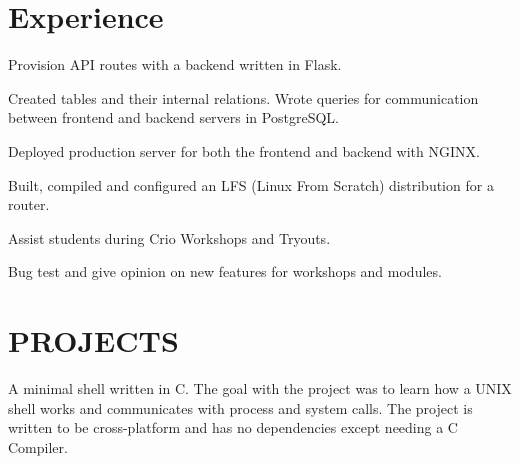 \documentclass[]{resume-openfont}
\begin{document}
\begin{minipage}[t]{0.66\textwidth}


\section{Experience}

\vspace{\topsep} %
\begin{tightemize}
\item Provision API routes with a backend written in Flask.
\item Created tables and their internal relations. Wrote queries for communication between frontend and backend servers in PostgreSQL.
\item Deployed production server for both the frontend and backend with NGINX.
\end{tightemize}
\sectionsep


\begin{tightemize}
\item Built, compiled and configured an LFS (Linux From Scratch) distribution for a router.
\end{tightemize}
\sectionsep

\begin{tightemize}
\item Assist students during Crio Workshops and Tryouts.
\item Bug test and give opinion on new features for workshops and modules.
\end{tightemize}
\sectionsep


\section{PROJECTS}

A minimal shell written in C. The goal with the project was to learn how a UNIX shell works and communicates with process and system calls. The project is written to be cross-platform and has no dependencies except needing a C Compiler.\\
\sectionsep


\end{minipage}
\end{document}
